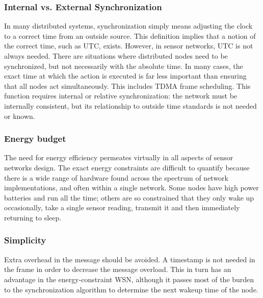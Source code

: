 \documentclass[a4paper,10pt]{report}
\begin{document}
\subsubsection{\textbf{Internal vs. External Synchronization}}
In many distributed systems, synchronization simply means adjusting the clock to a correct time from an outside source. This
definition implies that a notion of the correct time, such as UTC, exists. However, in sensor networks, UTC is not always needed. There are situations where distributed nodes need to be synchronized, but not necessarily with the absolute time.
In many cases, the exact time at which the action is executed is far less important than ensuring that all nodes act simultaneously. This includes TDMA frame scheduling. This function requires internal or relative synchronization: the network must be internally consistent, but its relationship to outside time standards is not needed or known.
\subsubsection{\textbf{Energy budget}} The need for energy efficiency permeates virtually in all aspects of sensor networks design. The exact energy constraints are difficult to quantify because there is a wide range of hardware found across the spectrum of network
implementations, and often within a single network. Some nodes have high power batteries and run all the time; others are so constrained that they only wake up occasionally, take a single sensor reading, transmit it and then immediately returning to sleep.
\subsubsection{\textbf{Simplicity}} Extra overhead in the message should be avoided. A timestamp is not needed in the frame in order to decrease the message overload. This in turn has an advantage in the energy-constraint WSN, although it passes most of the burden to the synchronization algorithm to determine the next wakeup time of the node.
\end{document}
